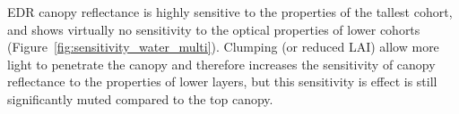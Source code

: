 
EDR canopy reflectance is highly sensitive to the properties of the tallest cohort, and shows virtually no sensitivity to the optical properties of lower cohorts (Figure~\ref{fig:sensitivity_water_multi}).
Clumping (or reduced LAI) allow more light to penetrate the canopy and therefore increases the sensitivity of canopy reflectance to the properties of lower layers, but this sensitivity is effect is still significantly muted compared to the top canopy.
